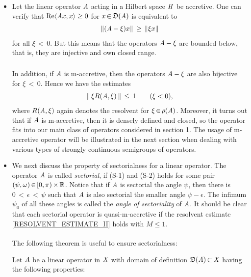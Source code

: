 \documentclass[11pt,twoside]{article}
\begin{document}
\begin{itemize}[leftmargin=4mm,itemsep=5pt]

\item[1.] %
Let the linear operator $\mathit{A}$ acting in a Hilbert space $\mathit{H}$ be accretive.
One can verify that
$\operatorname{Re} \langle \mathit{A} x,x \rangle \geq 0$ for $x {\,\in\,} \mathfrak{D}(\mathit{A})$ is equivalent to
\[
\left\lVert (\mathit{A} - \xi)x \right\rVert \, \geq \, \left\lVert \xi x \right\rVert
\]
for all $\xi {\,<\,} 0$.
But this means that the operators $\mathit{A} - \xi$ are bounded below,
that is, 
they are injective and own closed range.

\subparagraph{}
In addition,
if $\mathit{A}$ is m-accretive,
then the operators $\mathit{A} - \xi$ are also bijective for $\xi {\,<\,} 0$.
Hence we have the estimates
\[
\left\lVert \, \xi R(\mathit{A},\xi)\, \right\rVert \, \leq \, 1 \quad \quad (\xi < 0),
\]  
where $R(\mathit{A},\xi)$ again denotes the resolvent
for $\xi {\,\in\,} \rho(\mathit{A})$.
Moreover,
it turns out that if $\mathit{A}$ is m-accretive,
then it is densely defined and closed,
so the operator fits into our main class of operators considered in section 1.
The usage of m-accretive operator will be illustrated in the next section
when dealing with various types of strongly continuous semigroups of operators.

\item[2.] %
We next discuss the property of sectorialness for a linear operator.
The operator $\mathit{A}$ is called \textit{sectorial},
if (S-1) and (S-2) holds for some pair $(\psi,\omega) {\,\in\,} [0,\pi) {\,\times\,} {\mathbb{R}}$.
Notice that
if $\mathit{A}$ is sectorial {\wrt} the angle $\psi$,
then there is $0 {\,<\,} \epsilon {\,<\,} \psi$
such that $\mathit{A}$ is also sectorial {\wrt} the smaller angle $\psi - \epsilon$.
The infimum $\psi_0$ of all these angles is called
the \textit{angle of sectoriality} of $\mathit{A}$.
It should be clear that each sectorial operator is quasi-m-accretive
if the resolvent estimate \eqref{RESOLVENT_ESTIMATE_II} holds with $M \leq 1$.

\paragraph{} %
The following theorem is useful to ensure sectorialness:

\begin{theorem1}\label{CRITERION_FOR_SECTORIALNESS}
Let $\mathit{A}$ be a linear operator in $\mathit{X}$ with domain of definition
$\mathfrak{D}(\mathit{A}) {\,\subset\,} \mathit{X}$ having the following properties:


\end{theorem1}
\end{itemize}
\end{document}
